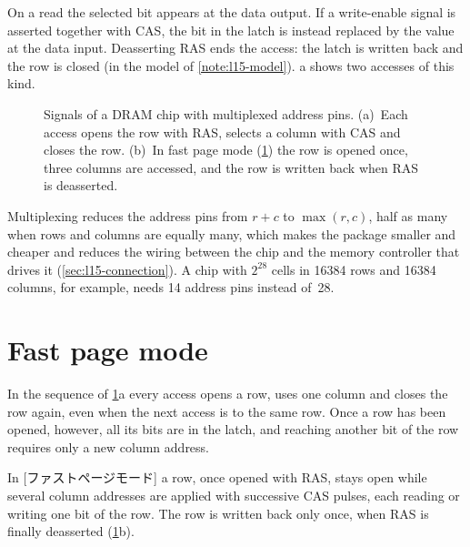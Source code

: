 \documentclass[../main.tex]{subfiles}
\begin{document}
On a read the selected bit appears at the data output.  If a write-enable
signal is asserted together with CAS, the bit in the latch is instead replaced
by the value at the data input.  Deasserting RAS ends the access: the latch is
written back and the row is closed (in the model of \cref{note:l15-model}).
a shows two
accesses of this kind.

\begin{figure}[htbp]
  \centering
  
  \caption{Signals of a DRAM chip with multiplexed address pins.  (a)~Each
    access opens the row with RAS, selects a column with CAS and closes the
    row.  (b)~In fast page mode (\cref{sec:l15-fpm}) the row is opened once,
    three columns are accessed, and the row is written back when RAS is
    deasserted.}
  \label{fig:l15-timing}
\end{figure}

Multiplexing reduces the address pins from $r+c$ to $\max(r,c)$, half as many
when rows and columns are equally many, which makes the package
smaller and cheaper and reduces the wiring between the chip and the memory
controller that drives it (\cref{sec:l15-connection}).  A chip with $2^{28}$
cells in \num{16384} rows and \num{16384} columns, for example, needs 14
address pins instead of~28.

\section{Fast page mode}
\label{sec:l15-fpm}

In the sequence of \cref{fig:l15-timing}a every access opens a row, uses one
column and closes the row again, even when the next access is to the same
row.  Once a row has been opened, however,
all its bits are in the latch, and reaching another bit of the row requires
only a new column address.

\begin{definition}
  In [ファストページモード] a row, once opened with RAS,
  stays open while several column addresses are applied with successive CAS
  pulses, each reading or writing one bit of the row.  The row is written back
  only once, when RAS is finally deasserted (\cref{fig:l15-timing}b).
\end{definition}

\end{document}
